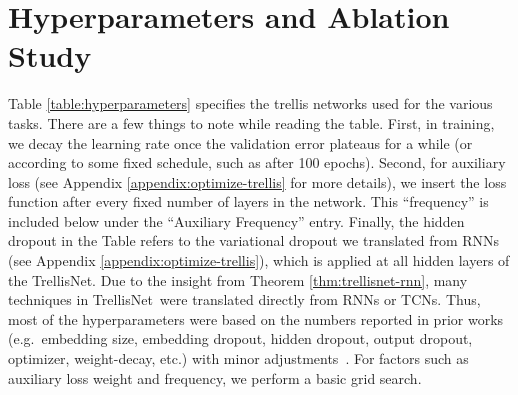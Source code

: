 \documentclass{article} \usepackage{iclr2019_conference,times}
\newcommand{\model}{TrellisNet}
\begin{document}
\section{Hyperparameters and Ablation Study}
\label{appendix:hyperparameters}

Table \ref{table:hyperparameters} specifies the trellis networks used for the various tasks. There are a few things to note while reading the table. First, in training, we decay the learning rate once the validation error plateaus for a while (or according to some fixed schedule, such as after 100 epochs). Second, for auxiliary loss (see Appendix \ref{appendix:optimize-trellis} for more details), we insert the loss function after every fixed number of layers in the network. This ``frequency'' is included below under the ``Auxiliary Frequency'' entry. Finally, the hidden dropout in the Table refers to the variational dropout we translated from RNNs (see Appendix \ref{appendix:optimize-trellis}), which is applied at all hidden layers of the \model. Due to the insight from Theorem \ref{thm:trellisnet-rnn}, many techniques in \model~were translated directly from RNNs or TCNs. Thus, most of the hyperparameters were based on the numbers reported in prior works (e.g.\ embedding size, embedding dropout, hidden dropout, output dropout, optimizer, weight-decay, etc.)  with minor adjustments~\citep{merityRegOpt,yang2018breaking,bradbury2016quasi,merity2018analysis,trinh2018learning,bai2018empirical,santoro2018relational}. For factors such as auxiliary loss weight and frequency, we perform a basic grid search.
\end{document}
